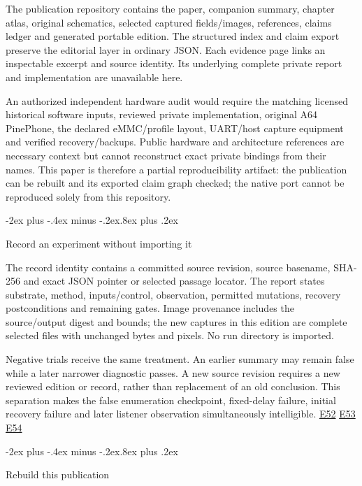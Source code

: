 \documentclass[10pt,letterpaper,twocolumn]{article}
\makeatletter
\renewcommand{\subsection}{\@startsection{subsection}{2}{0pt}
  {-2ex plus -.4ex minus -.2ex}{.8ex plus .2ex}
  {\normalfont\normalsize\bfseries\raggedright}}
\makeatother
\begin{document}
The publication repository contains the paper, companion summary, chapter atlas, original schematics, selected captured fields/images, references, claims ledger and generated portable edition. The structured index and claim export preserve the editorial layer in ordinary JSON. Each evidence page links an inspectable excerpt and source identity. Its underlying complete private report and implementation are unavailable here.

An authorized independent hardware audit would require the matching licensed historical software inputs, reviewed private implementation, original A64 PinePhone, the declared eMMC/profile layout, UART/host capture equipment and verified recovery/backups. Public hardware and architecture references are necessary context but cannot reconstruct exact private bindings from their names. This paper is therefore a partial reproducibility artifact: the publication can be rebuilt and its exported claim graph checked; the native port cannot be reproduced solely from this repository.

\subsection{Record an experiment without importing it}

The record identity contains a committed source revision, source basename, SHA-256 and exact JSON pointer or selected passage locator. The report states substrate, method, inputs/control, observation, permitted mutations, recovery postconditions and remaining gates. Image provenance includes the source/output digest and bounds; the new captures in this edition are complete selected files with unchanged bytes and pixels. No run directory is imported.

Negative trials receive the same treatment. An earlier summary may remain false while a later narrower diagnostic passes. A new source revision requires a new reviewed edition or record, rather than replacement of an old conclusion. This separation makes the false enumeration checkpoint, fixed-delay failure, initial recovery failure and later listener observation simultaneously intelligible. \hyperlink{e-E52}{\textsf{E52}} \hyperlink{e-E53}{\textsf{E53}} \hyperlink{e-E54}{\textsf{E54}}

\subsection{Rebuild this publication}
\end{document}
